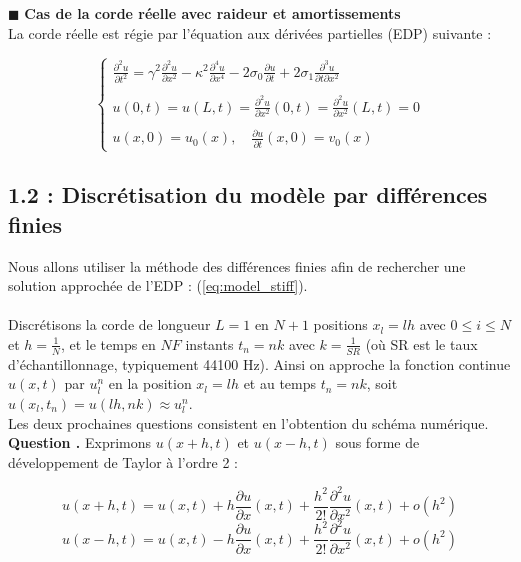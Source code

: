 \documentclass[a4,12pt]{article}
\newcounter{Nbquestion}
\newcommand*\question{%
\stepcounter{Nbquestion}%
\textbf{Question \theNbquestion. }}
\begin{document}

\indent $\blacksquare$ \textbf{Cas de la corde réelle avec raideur et amortissements}\\

La corde réelle est régie par l'équation aux dérivées partielles (EDP) suivante :

\begin{equation} 
\left\{
	\begin{array}{l}
		\displaystyle \frac{\partial^2 u}{\partial t^2}=\gamma^2 \frac{\partial^2 u}{\partial x^2}-\kappa^2  				\frac{\partial^4 u}{\partial x^4}-2\sigma_0  \frac{\partial u}{\partial t}+2\sigma_1  \frac{\partial^3 u}{\partial t		\partial x^2}\\ \\ 
		\displaystyle u(0,t)=u(L,t)=\frac{\partial^2 u}{\partial x^2}(0,t)=\frac{\partial^2 u}{\partial x^2}(L,t)=0\\ \\  		\displaystyle u(x,0)=u_0(x), \quad \frac{\partial u}{\partial t}(x,0)=v_0(x)
	\end{array}
\right. 
\label{eq:model_stiff}
\end{equation}

\subsection*{1.2 : Discrétisation du modèle par différences finies}

Nous allons utiliser la méthode des différences finies afin de rechercher une solution approchée de l'EDP : (\ref{eq:model_stiff}).\\\\
Discrétisons la corde de longueur $L=1$ en $N+1$ positions $x_l=lh$ avec $0\leqslant i\leqslant N$ et $h=\frac{1}{N}$, et le temps en $NF$ instants $t_n=nk$ avec $k=\frac{1}{SR}$ (où SR est le taux d'échantillonnage, typiquement 44100 Hz). Ainsi on approche la fonction continue $u(x,t)$ par $u_l^n$ en la position $x_l=lh$ et au temps $t_n=nk$, soit $u(x_l,t_n)=u(lh,nk)\approx u_l^n$. \\

Les deux prochaines questions consistent en l'obtention du schéma numérique.\\


\question Exprimons $u(x+h,t)$ et $u(x-h,t)$ sous forme de développement de Taylor à l'ordre 2 :

\[
u(x+h,t)=u(x,t)+h\frac{\partial u}{\partial x}(x,t)+\frac{h^2}{2!}\frac{\partial^2 u}{\partial x^2}(x,t)+o(h^2)
\]
\[
u(x-h,t)=u(x,t)-h\frac{\partial u}{\partial x}(x,t)+\frac{h^2}{2!}\frac{\partial^2 u}{\partial x^2}(x,t)+o(h^2)
\]
\end{document}

